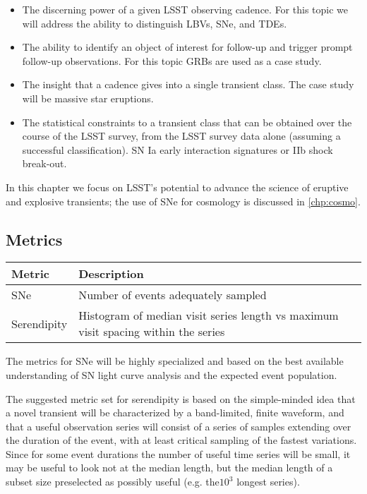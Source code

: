 \begin{itemize}
\item
The discerning power of a given LSST observing cadence. For this topic
we will address the ability to distinguish LBVs, SNe, and TDEs.
\item
The ability to identify an object of interest for follow-up and
trigger prompt follow-up observations. For this topic GRBs are used as
a case study.
\item
The insight that a cadence gives into a single transient class. The
case study will be massive star eruptions.
\item 
The statistical constraints to a transient class that can be obtained
over the course of the LSST survey, from the LSST survey data alone
(assuming a successful classification). SN Ia early interaction
signatures or IIb shock break-out.
\end{itemize}

In this chapter we focus on LSST's potential to advance the science of
eruptive and explosive transients; the use of SNe for cosmology is
discussed in \autoref{chp:cosmo}.



\subsection{Metrics}
\label{sec:\chpname:metrics}

\begin{center}
\begin{tabular}{| p{5cm} |p{10cm} |}
\hline Metric & Description\\ \hline SNe & Number of events adequately
sampled\\ Serendipity & Histogram of median visit series length vs
maximum visit spacing within the series\\ \hline \end{tabular}
 \end{center}


The metrics for SNe will be highly specialized and based on the best
available understanding of SN light curve analysis and the expected
event population.

The suggested metric set for serendipity is based on the simple-minded
idea that a novel transient will be characterized by a band-limited,
finite waveform, and that a useful observation series will consist of
a series of samples extending over the duration of the event, with at
least critical sampling of the fastest variations.  Since for some
event durations the number of useful time series will be small, it may
be useful to look not at the median length, but the median length of a
subset size preselected as possibly useful (e.g. the$10^3$ longest
series).

